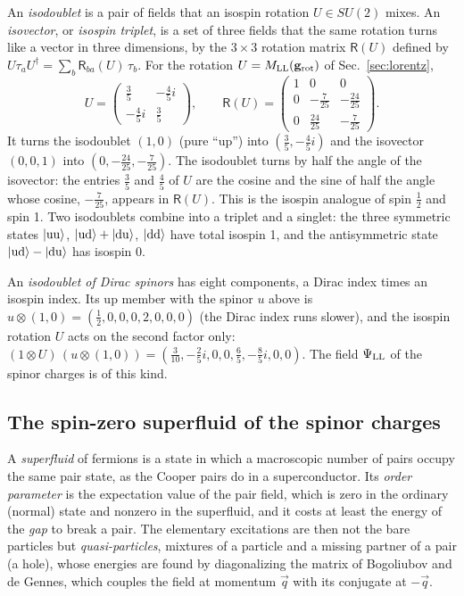 \documentclass[aps,prd,twocolumn,superscriptaddress,nofootinbib,floatfix,longbibliography]{revtex4-2}
\newcommand{\LL}{{\rm LL}}
\begin{document}
An \emph{isodoublet} is a pair of fields that an isospin rotation $U\in SU(2)$ mixes. An \emph{isovector}, or
\emph{isospin triplet}, is a set of three fields that the same rotation turns like a vector in three dimensions, by the
$3\times3$ rotation matrix $\mathsf R(U)$ defined by $U\tau_aU^\dagger=\sum_b\mathsf R_{ba}(U)\,\tau_b$. For the rotation
$U=M_\LL(\mathbf g_{\rm rot})$ of Sec.~\ref{sec:lorentz},
\begin{equation}
U=\begin{pmatrix}\tfrac{3}{5}&-\tfrac{4}{5}i\\-\tfrac{4}{5}i&\tfrac{3}{5}\end{pmatrix},\qquad \mathsf R(U)=\begin{pmatrix}1&0&0\\0&-\tfrac{7}{25}&-\tfrac{24}{25}\\0&\tfrac{24}{25}&-\tfrac{7}{25}\end{pmatrix}.
\label{eq:UR}
\end{equation}
It turns the isodoublet $(1,0)$ (pure ``up'') into $(\tfrac{3}{5},-\tfrac{4}{5}i)$ and the isovector $(0,0,1)$ into
$(0,-\tfrac{24}{25},-\tfrac{7}{25})$. The isodoublet turns by half the angle of the isovector: the entries $\frac35$ and $\frac45$ of $U$
are the cosine and the sine of half the angle whose cosine, $-\frac7{25}$, appears in $\mathsf R(U)$. This is the isospin analogue
of spin $\frac12$ and spin 1. Two isodoublets combine into a triplet and a singlet: the three symmetric states $|{\rm uu}\rangle$,
$|{\rm ud}\rangle+|{\rm du}\rangle$, $|{\rm dd}\rangle$ have total isospin 1, and the antisymmetric state
$|{\rm ud}\rangle-|{\rm du}\rangle$ has isospin 0.

An \emph{isodoublet of Dirac spinors} has eight components, a Dirac index times an isospin index. Its up member with the
spinor $u$ above is $u\otimes(1,0)=(\tfrac{1}{2},0,0,0,2,0,0,0)$ (the Dirac index runs slower), and the isospin rotation $U$ acts
on the second factor only: $(1\otimes U)\,(u\otimes(1,0))=(\tfrac{3}{10},-\tfrac{2}{5}i,0,0,\tfrac{6}{5},-\tfrac{8}{5}i,0,0)$. The field $\Psi_\LL$ of the spinor
charges is of this kind.

\subsection{The spin-zero superfluid of the spinor charges}
\label{sec:sf}

A \emph{superfluid} of fermions is a state in which a macroscopic number of pairs occupy the same pair state, as the
Cooper pairs do in a superconductor. Its \emph{order parameter} is the expectation value of the pair field, which is zero
in the ordinary (normal) state and nonzero in the superfluid, and it costs at least the energy of the \emph{gap} to break
a pair. The elementary excitations are then not the bare particles but \emph{quasi-particles}, mixtures of a particle and
a missing partner of a pair (a hole), whose energies are found by diagonalizing the matrix of Bogoliubov and de Gennes,
which couples the field at momentum $\vec q$ with its conjugate at $-\vec q$.
\end{document}

